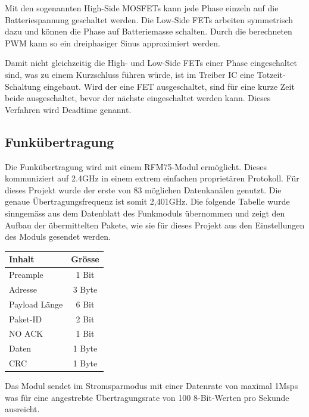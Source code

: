 Mit den sogenannten High-Side MOSFETs kann jede Phase einzeln auf die Batteriespannung geschaltet werden. Die Low-Side FETs arbeiten symmetrisch dazu und können die Phase auf Batteriemasse schalten. Durch die berechneten PWM kann so ein dreiphasiger Sinus approximiert werden. 

Damit nicht gleichzeitig die High- und Low-Side FETs einer Phase eingeschaltet sind, was zu einem Kurzschluss führen würde, ist im Treiber IC eine Totzeit-Schaltung eingebaut. Wird der eine FET ausgeschaltet, sind für eine kurze Zeit beide ausgeschaltet, bevor der nächste eingeschaltet werden kann. Dieses Verfahren wird Deadtime genannt.

\subsection{Funkübertragung}
Die Funkübertragung wird mit einem RFM75-Modul ermöglicht. Dieses kommuniziert auf 2.4GHz in einem extrem einfachen proprietären Protokoll. Für dieses Projekt wurde der erste von 83 möglichen Datenkanälen genutzt. Die genaue Übertragungsfrequenz ist somit 2,401GHz. Die folgende Tabelle wurde sinngemäss aus dem Datenblatt des Funkmoduls übernommen und zeigt den Aufbau der übermittelten Pakete, wie sie für dieses Projekt aus den Einstellungen des Moduls gesendet werden.
\begin{center}
	\begin{tabularx}{0.3\textwidth}{l|c}
		Inhalt & Grösse \\ \hline
		Preample& 1 Bit \\ \hline
		Adresse &3 Byte \\ \hline
		Payload Länge& 6 Bit \\ \hline
		Paket-ID &2 Bit \\ \hline
		NO ACK & 1 Bit \\ \hline
		Daten & 1 Byte \\ \hline
		CRC & 1 Byte \\ \hline
	\end{tabularx}
\end{center}

Das Modul sendet im Stromsparmodus mit einer Datenrate von maximal 1Msps was für eine angestrebte Übertragungsrate von 100 8-Bit-Werten pro Sekunde ausreicht.
\label{tGl_RF}
